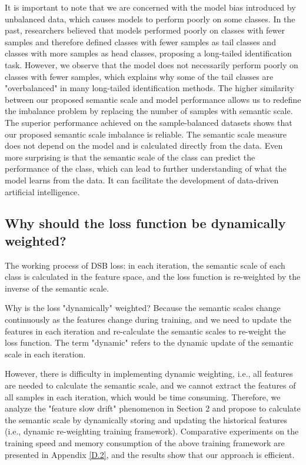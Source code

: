 \documentclass[10pt]{article} %
\begin{document}
It is important to note that we are concerned with the model bias introduced by unbalanced data, which causes models to perform poorly on some classes. In the past, researchers believed that models performed poorly on classes with fewer samples and therefore defined classes with fewer samples as tail classes and classes with more samples as head classes, proposing a long-tailed identification task. However, we observe that the model does not necessarily perform poorly on classes with fewer samples, which explains why some of the tail classes are "overbalanced" in many long-tailed identification methods. The higher similarity between our proposed semantic scale and model performance allows us to redefine the imbalance problem by replacing the number of samples with semantic scale. The superior performance achieved on the sample-balanced datasets shows that our proposed semantic scale imbalance is reliable. The semantic scale measure does not depend on the model and is calculated directly from the data. Even more surprising is that the semantic scale of the class can predict the performance of the class, which can lead to further understanding of what the model learns from the data. It can facilitate the development of data-driven artificial intelligence.

\subsection{Why should the loss function be dynamically weighted?}

The working process of DSB loss: in each iteration, the semantic scale of each class is calculated in the feature space, and the loss function is re-weighted by the inverse of the semantic scale.

Why is the loss "dynamically" weighted? Because the semantic scales change continuously as the features change during training, and we need to update the features in each iteration and re-calculate the semantic scales to re-weight the loss function. The term "dynamic" refers to the dynamic update of the semantic scale in each iteration.

However, there is difficulty in implementing dynamic weighting, i.e., all features are needed to calculate the semantic scale, and we cannot extract the features of all samples in each iteration, which would be time consuming. Therefore, we analyze the "feature slow drift" phenomenon in Section 2 and propose to calculate the semantic scale by dynamically storing and updating the historical features (i.e., dynamic re-weighting training framework). Comparative experiments on the training speed and memory consumption of the above training framework are presented in Appendix \ref{D.2}, and the results show that our approach is efficient.
\end{document}
